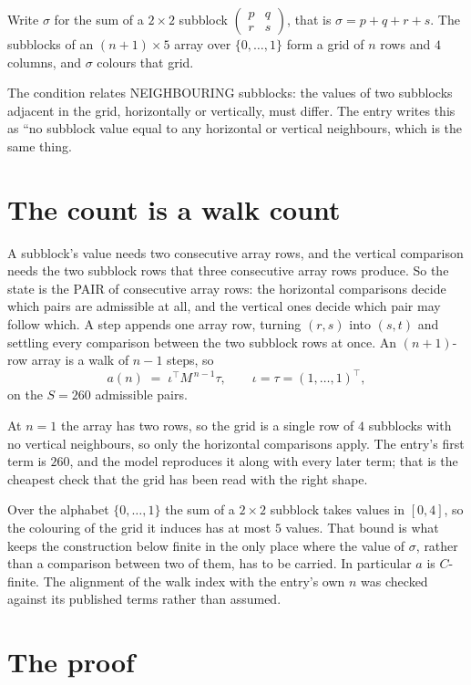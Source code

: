 \documentclass[11pt,a4paper]{article}
\theoremstyle{plain}
\theoremstyle{definition}
\begin{document}
Write $\sigma$ for the sum of a $2\times2$ subblock
$\begin{pmatrix}p&q\\r&s\end{pmatrix}$, that is $\sigma=p+q+r+s$. The subblocks of an
$(n+1)\times5$ array over $\{0,\dots,1\}$ form a grid of $n$ rows and $4$
columns, and $\sigma$ colours that grid.

The condition relates NEIGHBOURING subblocks: the values of two subblocks adjacent in the grid,
horizontally or vertically, must differ. The entry writes this as ``no subblock value equal to any horizontal or vertical neighbours, which is the same thing.

\section{The count is a walk count}

A subblock's value needs two consecutive array rows, and the vertical
comparison needs the two subblock rows that three consecutive array rows produce. So the state
is the PAIR of consecutive array rows: the horizontal comparisons decide which pairs are
admissible at all, and the vertical ones decide which pair may follow which. A step appends one
array row, turning $(r,s)$ into $(s,t)$ and settling every comparison between the two subblock
rows at once. An $(n+1)$-row array is a walk of $n-1$ steps, so
\[
a(n)\;=\;\iota^{\!\top}M^{\,n-1}\tau,\qquad\iota=\tau=(1,\dots,1)^{\!\top},
\]
on the $S=260$ admissible pairs.

At $n=1$ the array has two rows, so the grid is a single row of $4$
subblocks with no vertical neighbours, so only the horizontal comparisons apply. The
entry's first term is $260$, and the model reproduces it along with every later term; that
is the cheapest check that the grid has been read with the right shape.

Over the alphabet $\{0,\dots,1\}$ the sum of a $2\times2$ subblock takes values in
$[0,4]$, so the colouring of the grid it induces has at most $5$ values.
That bound is what keeps the construction below finite in the only place where the value of
$\sigma$, rather than a comparison between two of them, has to be carried.
In particular $a$ is $C$-finite. The alignment of the walk index with the entry's own $n$ was
checked against its published terms rather than assumed.

\section{The proof}
\end{document}
